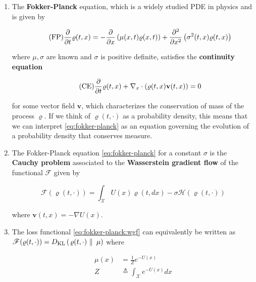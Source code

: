 \begin{enumerate}
  \item The \textbf{Fokker-Planck} equation, which is a widely studied PDE in
    physics and is given by

    \begin{equation}\label{eq:fokker-planck}\tag{FP}
      \frac{\partial }{\partial t}\varrho(t, x) = -\frac{\partial }{\partial x}\left(\mu(x,
        t)\varrho(x, t)\right) + \frac{\partial^2}{\partial
      x^2}\left(\sigma^2(t, x)\varrho(t, x)\right)
    \end{equation}

    where $\mu,\sigma$ are known and $\sigma$ is positive definite, satisfies
    the \textbf{continuity equation}

    \begin{equation}\label{eq:continuity-equation}\tag{CE}
      \frac{\partial }{\partial t}\varrho(t, x) + \nabla_x\cdot(\varrho(t, x)\mathbf{v}(t,
      x)) = 0
    \end{equation}

    for some vector field $\mathbf{v}$, which characterizes the conservation of
    mass of the process $\varrho$. If we think of $\varrho(t, \cdot)$ as a
    probability density, this means that we can interpret
    \eqref{eq:fokker-planck} as an equation governing the evolution of a
    probability density that conserves measure.
  \item The Fokker-Planck equation \eqref{eq:fokker-planck} for a constant
    $\sigma$ is the
    \textbf{Cauchy problem} associated to the \textbf{Wasserstein gradient flow}
    of the functional $\mathscr{F}$ given by

    \begin{equation}\label{eq:fokker-planck:wgf}\tag{FPWGF}
      \mathscr{F}(\varrho(t,\cdot)) = \int_{\mathcal{X}}U(x)\varrho(t, dx) -
      \sigma\mathcal{H}(\varrho(t,\cdot))
    \end{equation}

    where $\mathbf{v}(t, x) = -\nabla U(x)$.

  \item The loss functional \eqref{eq:fokker-planck:wgf} can equivalently be
    written as $\mathscr{F}(\varrho(t, \cdot)) = D_{\text{KL}}\left(\left. \varrho(t, \cdot)\ \right\|\ \mu\right)$ where

    \begin{align*}
      \mu(x) &= \frac{1}{Z}e^{-U(x)}\\
      Z &\triangleq\int_{\mathcal{X}}e^{-U(x)}dx
    \end{align*}


\end{enumerate}
